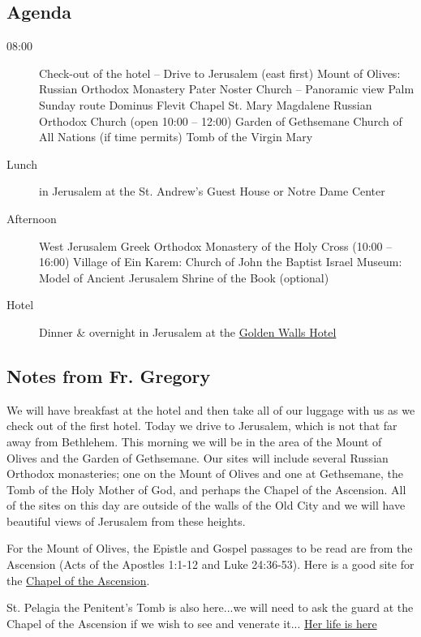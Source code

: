 \documentclass[letterpaper]{report}
\begin{document}
\subsection{Agenda}
\begin{description}
	\item[08:00] Check-out of the hotel – Drive to Jerusalem (east first)
	    \subitem Mount of Olives: Russian Orthodox Monastery
	    \subitem Pater Noster Church -- Panoramic view
	    \subitem Palm Sunday route
	    \subitem Dominus Flevit Chapel
	    \subitem St. Mary Magdalene Russian Orthodox Church
	        (open 10:00 – 12:00)
	    \subitem Garden of Gethsemane
	    \subitem Church of All Nations (if time permits)
	    \subitem Tomb of the Virgin Mary
	\item[Lunch] in Jerusalem at the
			St. Andrew’s Guest House or Notre Dame Center
	\item[Afternoon] West Jerusalem
	    \subitem Greek Orthodox Monastery of the Holy Cross (10:00 – 16:00)
		\subitem Village of Ein Karem: Church of John the Baptist 
		\subitem Israel Museum: Model of Ancient Jerusalem
		\subitem Shrine of the Book (optional)
	\item[Hotel] Dinner \& overnight in Jerusalem at the
	    \href{http://goldenwalls.com/}{Golden Walls Hotel}
\end{description}

\subsection{Notes from Fr. Gregory}
We will have breakfast at the hotel and then take all of our luggage with us 
as we check out of the first hotel.
Today we drive to Jerusalem, which is not that far away from Bethlehem.
This morning we will be in the area of the Mount of Olives and the Garden of
Gethsemane.
Our sites will include several Russian Orthodox monasteries;
one on the Mount of Olives and one at Gethsemane,
the Tomb of the Holy Mother of God,
and perhaps the Chapel of the Ascension.
All of the sites on this day are outside of the walls of the Old City and we
will have beautiful views of Jerusalem from these heights.

For the Mount of Olives, the Epistle and Gospel passages to be read are from
the Ascension (Acts of the Apostles 1:1-12 and Luke 24:36-53).
Here is a good site for the 
\href{http://www.sacred-destinations.com/israel/jerusalem-chapel-of-ascension}{
    Chapel of the Ascension}.

St. Pelagia the Penitent's Tomb is also here...we will need to ask the guard 
at the Chapel of the Ascension if we wish to see and venerate it...
\href{http://www.antiochian.org/node/16762}{
	Her life is here}
\end{document}
